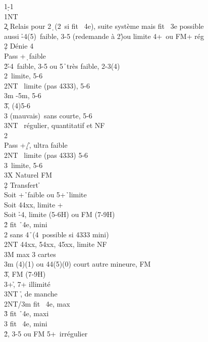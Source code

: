 \documentclass[a4paper]{article}
\begin{document}
\begin{bidtable}
1\d-1\h\\
1NT\+\\
2\c \> Relais pour 2\d\ (2\s\ si fit \s\ 4e), suite système mais fit \s\ 3e possible\+\\
aussi \h -4(5)\s\ faible, 3-5 (redemande à 2\h )ou limite 4+\s\ ou FM+ rég\\
2\d \> Dénie 4\s \+\\
Pass +\d\ faible\\
2\h {}\h -4\s\ faible, 3-5 ou 5\h\ très faible, 2-3(4)\\
2\s {}\s\ limite, 5-6\\
2NT \s\ limite (pas 4333), 5-6\\
3m \s -5m, 5-6\\
3\h {}\h , (4)5-6\\
3\s {} (mauvais)\s\ sans courte, 5-6\\
3NT \s\ régulier, quantitatif et NF\-\\
2\s\+\\
Pass +\d /\h , ultra faible\\
2NT \s\ limite (pas 4333) 5-6\\
3\s {}\s\ limite, 5-6\\
3X \> Naturel FM\-\-\\
2\d \> Transfert \h \+\\
Soit +\h\ faible ou 5+\h\ limite\\
Soit \> 44xx, limite +\\
Soit \h -4\s , limite (5-6H) ou FM (7-9H)\\
2\h \> fit \h\ 4e, mini\\
2\s \> sans 4\h\ (4\s\ possible si 4333 mini)\+\\
2NT \> 44xx, 54xx, 45xx, limite NF\+\\
3M \> max 3 cartes\-\\
3m (4)(1) ou 44(5)(0) court autre mineure, FM\\
3\h {}\h , FM (7-9H)\\
3\s {}+\h , 7+ illimité\\
3NT \h , de manche\-\\
2NT/3m \> fit \s\ 4e, max\\
3\h \> fit \h\ 4e, maxi\\
3\s \> fit \s\ 4e, mini\-\\
2\h {}\s , 3-5 ou FM 5+\s\ irrégulier\+\\

\end{bidtable}
\end{document}
